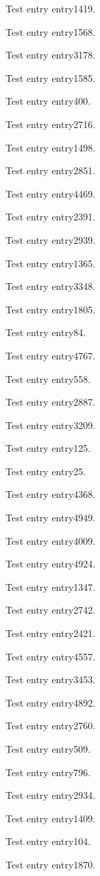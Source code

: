 Test entry \gls{entry1419}.

Test entry \gls{entry1568}.

Test entry \gls{entry3178}.

Test entry \gls{entry1585}.

Test entry \gls{entry400}.

Test entry \gls{entry2716}.

Test entry \gls{entry1498}.

Test entry \gls{entry2851}.

Test entry \gls{entry4469}.

Test entry \gls{entry2391}.

Test entry \gls{entry2939}.

Test entry \gls{entry1365}.

Test entry \gls{entry3348}.

Test entry \gls{entry1805}.

Test entry \gls{entry84}.

Test entry \gls{entry4767}.

Test entry \gls{entry558}.

Test entry \gls{entry2887}.

Test entry \gls{entry3209}.

Test entry \gls{entry125}.

Test entry \gls{entry25}.

Test entry \gls{entry4368}.

Test entry \gls{entry4949}.

Test entry \gls{entry4009}.

Test entry \gls{entry4924}.

Test entry \gls{entry1347}.

Test entry \gls{entry2742}.

Test entry \gls{entry2421}.

Test entry \gls{entry4557}.

Test entry \gls{entry3453}.

Test entry \gls{entry4892}.

Test entry \gls{entry2760}.

Test entry \gls{entry509}.

Test entry \gls{entry796}.

Test entry \gls{entry2934}.

Test entry \gls{entry1409}.

Test entry \gls{entry104}.

Test entry \gls{entry1870}.

